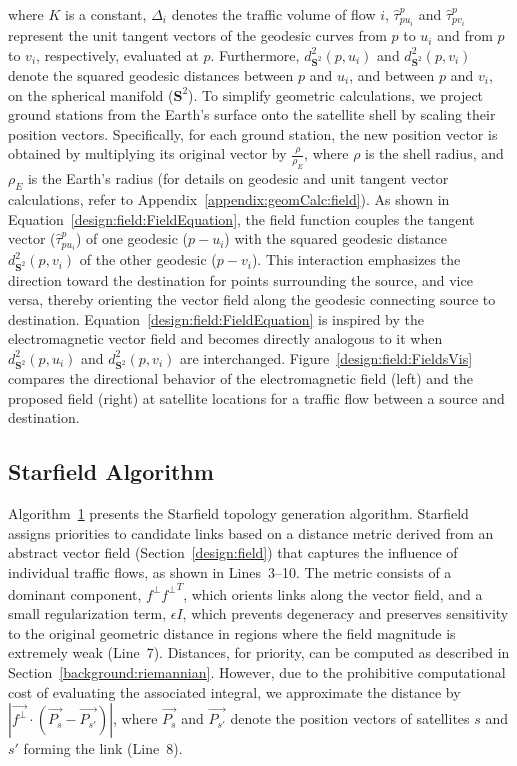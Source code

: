 \documentclass[acmsmall, screen]{acmart}
\begin{document}
where $K$ is a constant, $\Delta_i$ denotes the traffic volume of flow $i$, $\hat{\tau}^p_{pu_i}$ and $\hat{\tau}^p_{pv_i}$ represent the unit tangent vectors of the geodesic curves from $p$ to $u_i$ and from $p$ to $v_i$, respectively, evaluated at $p$. Furthermore, $d^2_{\mathbf{S}^2}(p,u_i)$ and $d^2_{\mathbf{S}^2}(p,v_i)$ denote the squared geodesic distances between $p$ and $u_i$, and between $p$ and $v_i$, on the spherical manifold ($\mathbf{S}^2$). To simplify geometric calculations, we project ground stations from the Earth’s surface onto the satellite shell by scaling their position vectors. Specifically, for each ground station, the new position vector is obtained by multiplying its original vector by $\frac{\rho}{\rho_E}$, where $\rho$ is the shell radius, and $\rho_E$ is the Earth's radius (for details on geodesic and unit tangent vector calculations, refer to Appendix~\ref{appendix:geomCalc:field}). As shown in Equation~\ref{design:field:FieldEquation}, the field function couples the tangent vector ($\hat{\tau}^p_{pu_i}$) of one geodesic ($p-u_i$) with the squared geodesic distance $d^2_{\mathbf{S}^2}(p,v_i)$ of the other geodesic ($p-v_i$). This interaction emphasizes the direction toward the destination for points surrounding the source, and vice versa, thereby orienting the vector field along the geodesic connecting source to destination. Equation~\ref{design:field:FieldEquation} is inspired by the electromagnetic vector field and becomes directly analogous to it when $d^2_{\mathbf{S}^2}(p,u_i)$ and $d^2_{\mathbf{S}^2}(p,v_i)$ are interchanged. Figure~\ref{design:field:FieldsVis} compares the directional behavior of the electromagnetic field (left) and the proposed field (right) at satellite locations for a traffic flow between a source and destination.

\subsection{Starfield Algorithm}\label{design:algorithm}

Algorithm~\hyperref[design:overview:algorithm]{1} presents the Starfield topology generation algorithm. Starfield assigns priorities to candidate links based on a distance metric derived from an abstract vector field (Section~\ref{design:field}) that captures the influence of individual traffic flows, as shown in Lines~3–10. The metric consists of a dominant component, $f^{\perp}{f^{\perp}}^T$, which orients links along the vector field, and a small regularization term, $\epsilon I$, which prevents degeneracy and preserves sensitivity to the original geometric distance in regions where the field magnitude is extremely weak (Line~7). Distances, for priority, can be computed as described in Section~\ref{background:riemannian}. However, due to the prohibitive computational cost of evaluating the associated integral, we approximate the distance by $|\vec{f^{\perp}} \cdot (\vec{P_s} - \vec{P_{s'}})|$, where $\vec{P_s}$ and $\vec{P_{s'}}$ denote the position vectors of satellites $s$ and $s'$ forming the link (Line~8).
\end{document}
